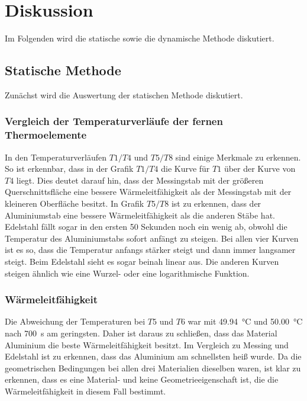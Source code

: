 \section{Diskussion}
\label{sec:Diskussion}
Im Folgenden wird die statische sowie die dynamische Methode diskutiert.
\subsection{Statische Methode}
Zunächst wird die Auswertung der statischen Methode diskutiert.
\subsubsection{Vergleich der Temperaturverläufe der fernen Thermoelemente}
In den Temperaturverläufen $T1/T4$ und $T5/T8$ sind einige Merkmale zu erkennen. 
So ist erkennbar, dass in der Grafik $T1/T4$ die Kurve für $T1$ über der Kurve von $T4$ liegt. Dies deutet darauf hin, dass der Messingstab mit 
der größeren Querschnittsfläche eine bessere Wärmeleitfähigkeit als der Messingstab mit der kleineren Oberfläche besitzt. 
In Grafik $T5/T8$ ist zu erkennen, dass der Aluminiumstab eine bessere Wärmeleitfähigkeit als die anderen Stäbe hat. Edelstahl fällt sogar in den ersten 50 Sekunden 
noch ein wenig ab, obwohl die Temperatur des Aluminiumstabs sofort anfängt zu steigen. 
Bei allen vier Kurven ist es so, dass die Temperatur anfangs stärker steigt und dann immer langsamer steigt. Beim Edelstahl sieht es sogar 
beinah linear aus. Die anderen Kurven steigen ähnlich wie eine Wurzel- oder eine logarithmische Funktion.

\subsubsection{Wärmeleitfähigkeit}
Die Abweichung der Temperaturen bei $T5$ und $T6$ war mit \SI{49.94}{\degreeCelsius} und \SI{50.00}{\degreeCelsius} nach \SI{700}{\second} am geringsten. Daher 
ist daraus zu schließen, dass das Material Aluminium die beste Wärmeleitfähigkeit besitzt. 
Im Vergleich zu Messing und Edelstahl ist zu erkennen, dass das Aluminium  am schnellsten heiß wurde. Da die geometrischen
Bedingungen bei allen drei Materialien dieselben waren, ist klar zu erkennen, dass es eine Material- und keine
Geometrieeigenschaft ist, die die Wärmeleitfähigkeit in diesem Fall bestimmt.

